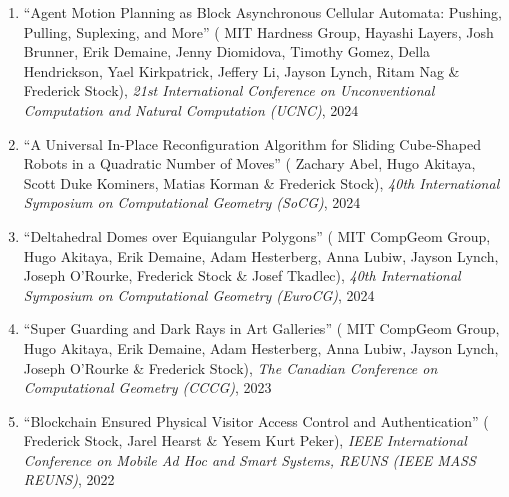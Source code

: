 \documentclass[letterpaper,11pt]{article}
\makeatletter
\newcommand{\resumeSubHeadingListEnd}{\end{itemize}}
\newcommand{\publication}[6]{
  \item ``#1'' %
   (\ignorespaces#2), %
     \emph{#3}, %
      #4%


}
\newcommand{\pdficon}{\faFilePdf}
\newcommand{\doilabel}{\texttt{DOI}}
\makeatother
\begin{document}
\begin{enumerate}
        \publication
          {Agent Motion Planning as Block Asynchronous Cellular Automata: Pushing, Pulling, Suplexing, and More}
          {
 MIT Hardness Group, Hayashi Layers, Josh Brunner, Erik Demaine, Jenny Diomidova, Timothy Gomez, Della Hendrickson, Yael Kirkpatrick, Jeffery Li, Jayson Lynch, Ritam Nag \& Frederick Stock}
          {21st International Conference on Unconventional Computation and Natural Computation (UCNC)}
          {2024}
          {%
\href{fred-stock.github.io/docstore/Block-Pushing-UCNC.pdf}{\pdficon}%
%
\quad\href{https://doi.org/10.1007/978-3-031-63742-1_16}{\doilabel}%
          }
          {17}
 \vspace{-.5em}  
      
        \publication
          {A Universal In-Place Reconfiguration Algorithm for Sliding Cube-Shaped Robots in a Quadratic Number of Moves}
          {
 Zachary Abel, Hugo Akitaya, Scott Duke Kominers, Matias Korman \& Frederick Stock}
          {40th International Symposium on Computational Geometry (SoCG)}
          {2024}
          {%
\href{fred-stock.github.io/docstore/Universal-In-Place-Sliding-Cubes-SOCG.pdf}{\pdficon}%
%
\quad\href{https://doi.org/10.4230/LIPIcs.SoCG.2024.1}{\doilabel}%
          }
          {18}
 \vspace{-.5em}  
      
        \publication
          {Deltahedral Domes over Equiangular Polygons}
          {
 MIT CompGeom Group, Hugo Akitaya, Erik Demaine, Adam Hesterberg, Anna Lubiw, Jayson Lynch, Joseph O'Rourke, Frederick Stock \& Josef Tkadlec}
          {40th International Symposium on Computational Geometry (EuroCG)}
          {2024}
          {%
\href{fred-stock.github.io/docstore/Domes-Over-Polygons-EuroCG.pdf}{\pdficon}%
%
\quad\href{https://doi.org/10.48550/arXiv.2408.04687}{\doilabel}%
          }
          {19}
 \vspace{-.5em}  
      
        \publication
          {Super Guarding and Dark Rays in Art Galleries}
          {
 MIT CompGeom Group, Hugo Akitaya, Erik Demaine, Adam Hesterberg, Anna Lubiw, Jayson Lynch, Joseph O'Rourke \& Frederick Stock}
          {The Canadian Conference on Computational Geometry (CCCG)}
          {2023}
          {%
\href{fred-stock.github.io/docstore/DarkRaysAG-CCCG.pdf}{\pdficon}%
%
%
          }
          {20}
 \vspace{-.5em}  
      
        \publication
          {Blockchain Ensured Physical Visitor Access Control and Authentication}
          {
 Frederick Stock, Jarel Hearst \& Yesem Kurt Peker}
          {IEEE International Conference on Mobile Ad Hoc and Smart Systems, REUNS (IEEE MASS REUNS)}
          {2022}
          {%
\href{fred-stock.github.io/docstore/blockchain-accesscontrol-REUNS.pdf}{\pdficon}%
%
%
          }
          {21}
 
    \setcounter{pubnum}{\value{enumi}}
    \end{enumerate}
\end{document}
